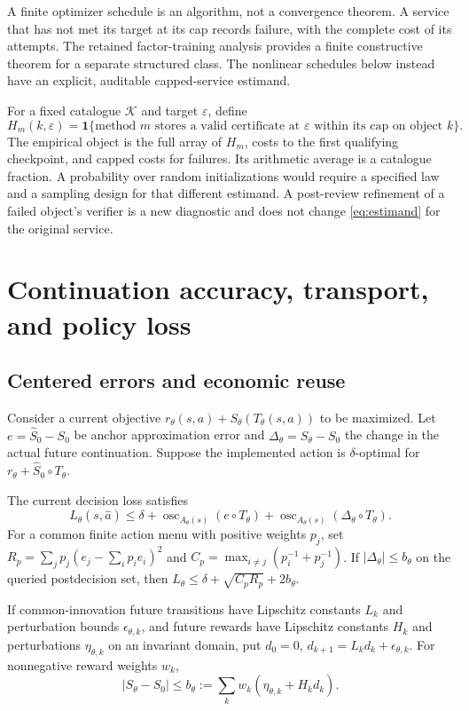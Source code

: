 \documentclass[ecta,nameyear,draft]{econsocart}
\begin{document}
A finite optimizer schedule is an algorithm, not a convergence theorem. A service that has not met its target at its cap records failure, with the complete cost of its attempts. The retained factor-training analysis provides a finite constructive theorem for a separate structured class. The nonlinear schedules below instead have an explicit, auditable capped-service estimand.

For a fixed catalogue $\mathcal K$ and target $\varepsilon$, define
\begin{equation}\label{eq:estimand}
 H_m(k,\varepsilon)=\mathbf1\{\text{method $m$ stores a valid certificate
 at $\varepsilon$ within its cap on object $k$}\}.
\end{equation}
The empirical object is the full array of $H_m$, costs to the first qualifying checkpoint, and capped costs for failures. Its arithmetic average is a catalogue fraction. A probability over random initializations would require a specified law and a sampling design for that different estimand. A post-review refinement of a failed object's verifier is a new diagnostic and does not change \eqref{eq:estimand} for the original service.

\section{Continuation accuracy, transport, and policy loss}\label{sec:theory}
\subsection{Centered errors and economic reuse}
Consider a current objective $r_\theta(s,a)+S_\theta(T_\theta(s,a))$ to be maximized. Let $e=\widehat S_0-S_0$ be anchor approximation error and $\Delta_\theta=S_\theta-S_0$ the change in the actual future continuation. Suppose the implemented action is $\delta$-optimal for $r_\theta+\widehat S_0\circ T_\theta$.

\begin{proposition}\label{prop:center}
The current decision loss satisfies
\begin{equation}\label{eq:osc}
 L_\theta(s,\widehat a)\leq\delta+
 \operatorname{osc}_{A_\theta(s)}(e\circ T_\theta)+
 \operatorname{osc}_{A_\theta(s)}(\Delta_\theta\circ T_\theta).
\end{equation}
For a common finite action menu with positive weights $p_j$, set
$R_p=\sum_jp_j(e_j-\sum_ip_ie_i)^2$ and
$C_p=\max_{i\ne j}(p_i^{-1}+p_j^{-1})$. If $|\Delta_\theta|\leq b_\theta$ on the queried postdecision set, then
$L_\theta\leq\delta+\sqrt{C_pR_p}+2b_\theta$.

If common-innovation future transitions have Lipschitz constants $L_k$ and perturbation bounds $\epsilon_{\theta,k}$, and future rewards have Lipschitz constants $H_k$ and perturbations $\eta_{\theta,k}$ on an invariant domain, put $d_0=0$, $d_{k+1}=L_kd_k+\epsilon_{\theta,k}$. For nonnegative reward weights $w_k$,
\begin{equation}\label{eq:transport}
 |S_\theta-S_0|\leq b_\theta:=\sum_kw_k(\eta_{\theta,k}+H_kd_k).
\end{equation}
\end{proposition}
\end{document}
